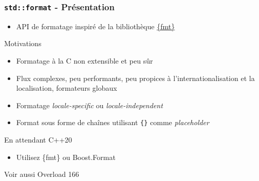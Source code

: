 \documentclass[C++.tex]{subfiles}
\begin{document}
\begin{frame}[fragile]
	\frametitle{\lstinline|std::format| - Présentation}
	\begin{itemize}
		\item API de formatage inspiré de la bibliothèque \href{https://github.com/fmtlib/fmt}{\{fmt\}}
	\end{itemize}
		
	\begin{block}{Motivations}
		\begin{itemize}
			\item Formatage \og à la C\fg{} non extensible et peu sûr


			\item Flux complexes, peu performants, peu propices à l'internationalisation et la localisation, formateurs globaux

		\end{itemize}
	\end{block}

	\begin{itemize}
		\item Formatage \textit{locale-specific} ou \textit{locale-independent}


		\item Format sous forme de chaînes utilisant \lstinline|{}| comme \textit{placeholder}
	\end{itemize}

	\begin{block}{En attendant C++20}
		\begin{itemize}
			\item Utilisez \{fmt\} ou Boost.Format
		\end{itemize}
	\end{block}

	\begin{block}{Voir aussi}
		Overload 166
	\end{block}
\end{frame}
\end{document}
